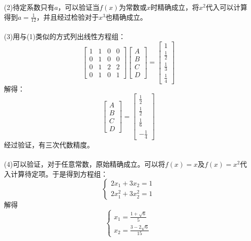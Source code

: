 \documentclass{article}
\begin{document}
\begin{itemize}
		(2)待定系数只有$a$，可以验证当$f(x)$为常数或$x$时精确成立，将$x^2$代入可以计算得到$a = \frac{1}{12}$，并且经过检验对于$x^3$也精确成立。\\\\
		(3)用与(1)类似的方式列出线性方程组：
		\begin{equation}
			\nonumber
			\begin{bmatrix}1 & 1 & 0 & 0\\0 & 1 & 0 & 0 \\ 0 &1 & 2 & 2\\0 & 1 & 0 & 1\end{bmatrix}
			\begin{bmatrix}A\\B\\C\\D\end{bmatrix}
			=
			\begin{bmatrix}1\\\frac{1}{2}\\\frac{1}{3}\\\frac{1}{4}\end{bmatrix}
		\end{equation}
			解得：
		\begin{equation}
		\nonumber
		\begin{bmatrix}A\\B\\C\\D\end{bmatrix}
		=
		\begin{bmatrix}\frac{1}{2}\\\frac{1}{2}\\\frac{1}{6}\\-\frac{1}{4}\end{bmatrix}
		\end{equation}
		经过验证，有三次代数精度。\\\\
		(4)可以验证，对于任意常数，原始精确成立。可以将$f(x) = x $及$f(x) = x^2$代入计算待定项。于是得到方程组：
		$$
		\left\{
			\begin{array}{lcl}
			2x_1 + 3x_2 = 1 \\
			2x_1^2 + 3x_2^2 = 1 
			\end{array}
		\right.
		$$
		解得
		\begin{equation}
		\nonumber
		\left\{
		\begin{array}{lcl}
			x_1 = \frac{1+\sqrt{6}}{5} \\
			x_2 = \frac{3-2\sqrt{6}}{15} 
		\end{array}

\end{equation}
\end{itemize}
\end{document}
